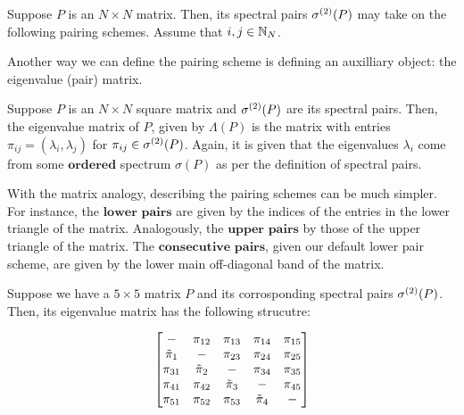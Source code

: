 \medskip
{}
Suppose $P$ is an $N \times N$ matrix. Then, its spectral pairs ${\sigma^{(2)}}(P)$ may take on the following pairing schemes. Assume that $i,j \in \mathbb{N}_N$. \newline
\begin{center}
\pairingschemetableNOIJ %
\end{center}
\vspace{1em}

\noindent Another way we can define the pairing scheme is defining an auxilliary object: the eigenvalue (pair) matrix.
\medskip
{}
\begin{definition}
Suppose $P$ is an $N \times N$ square matrix and ${\sigma^{(2)}}(P)$ are its spectral pairs.
Then, the eigenvalue matrix of $P$, given by $\Lambda(P)$ is the matrix with entries $\pi_{ij} = (\lambda_i, \lambda_j)$ for ${\pi_{ij}} \in {\sigma^{(2)}}(P)$.
Again, it is given that the eigenvalues $\lambda_i$ come from some $\textbf{ordered}$ spectrum $\sigma(P)$ as per the definition of spectral pairs.
\end{definition}

With the matrix analogy, describing the pairing schemes can be much simpler.
For instance, the $\textbf{lower pairs}$ are given by the indices of the entries in the lower triangle of the matrix.
Analogously, the $\textbf{upper pairs}$ by those of the upper triangle of the matrix.
The $\textbf{consecutive pairs}$, given our default lower pair scheme, are given by the lower main off-diagonal band of the matrix.

\begin{example}
Suppose we have a $5 \times 5$ matrix $P$ and its corrosponding spectral pairs ${\sigma^{(2)}}(P)$. Then, its eigenvalue matrix has the following strucutre:
\end{example}
$$
\begin{bmatrix}
-      & \pi_{12} & \pi_{13}   & \pi_{14} & \pi_{15} \\
{\tilde{\pi}}_{1} & -      & \pi_{23}   & \pi_{24} & \pi_{25} \\
\pi_{31} & {\tilde{\pi}}_{2} & -        & \pi_{34} & \pi_{35} \\
\pi_{41} & \pi_{42} & {\tilde{\pi}}_{3} & -        & \pi_{45} \\
\pi_{51} & \pi_{52} & \pi_{53} & {\tilde{\pi}}_{4} & -        \\
\end{bmatrix}
$$
\newline

